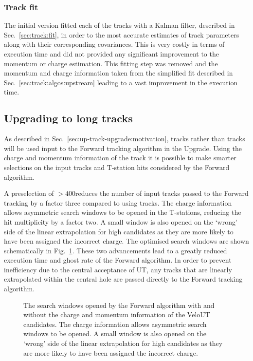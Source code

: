 \subsubsection{Track fit}

The initial version fitted each of the \velout tracks with a Kalman filter, described in Sec.~\ref{sec:track:fit}, in order to the most accurate estimates of track parameters along with their corresponding covariances. This is very costly in terms of execution time and did not provided any significant improvement to the momentum or charge estimation. This fitting step was removed and the momentum and charge information taken from the simplified fit described in Sec.~\ref{sec:track:algos:upstream} leading to a vast improvement in the execution time.

\subsection{Upgrading to long tracks}

As described in Sec.~\ref{sec:up-track-upgrade:motivation}, \velout tracks rather than \velo tracks will be used input to the Forward tracking algorithm in the \lhcb Upgrade. Using the charge and momentum information of the \velout track it is possible to make smarter selections on the input tracks and T-station hits considered by the Forward algorithm. 

A preselection of \pt $>400$\mevc reduces the number of input tracks passed to the Forward tracking by a factor three compared to using \velo tracks. The charge information allows asymmetric search windows to be opened in the T-stations, reducing the hit multiplicity by a factor two. A small window is also opened on the `wrong' side of the linear extrapolation for high \pt candidates as they are more likely to have been assigned the incorrect charge. The optimised search windows are shown schematically in Fig.~\ref{fig:searchwindow}. These two advancements lead to a greatly reduced execution time and ghost rate of the Forward algorithm. In order to prevent inefficiency due to the central acceptance of UT, any \velo tracks that are linearly extrapolated within the central hole are passed directly to the Forward tracking algorithm.

\begin{figure}[!htb]

\caption{The search windows opened by the Forward algorithm with and without the charge and momentum information of the VeloUT candidates. The charge information allows asymmetric search windows to be opened. A small window is also opened on the `wrong' side of the linear extrapolation for high \pt candidates as they are more likely to have been assigned the incorrect charge.}
\label{fig:searchwindow}
\end{figure}

